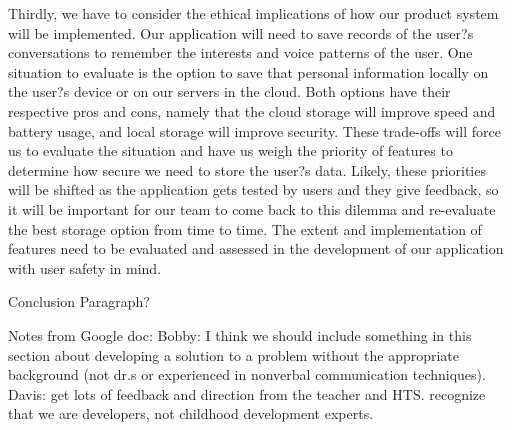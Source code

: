 Thirdly, we have to consider the ethical implications of how our product system will be implemented. Our application will need to save records of the user?s conversations to remember the interests and voice patterns of the user. One situation to evaluate is the option to save that personal information locally on the user?s device or on our servers in the cloud. Both options have their respective pros and cons, namely that the cloud storage will improve speed and battery usage, and local storage will improve security. These trade-offs will force us to evaluate the situation and have us weigh the priority of features to determine how secure we need to store the user?s data. Likely, these priorities will be shifted as the application gets tested by users and they give feedback, so it will be important for our team to come back to this dilemma and re-evaluate the best storage option from time to time. The extent and implementation of features need to be evaluated and assessed in the development of our application with user safety in mind.


Conclusion Paragraph?

Notes from Google doc:
Bobby: I think we should include something in this section about developing a solution to a problem without the appropriate background (not dr.s or experienced in nonverbal communication techniques).
Davis: get lots of feedback and direction from the teacher and HTS. recognize that we are developers, not childhood development experts.

